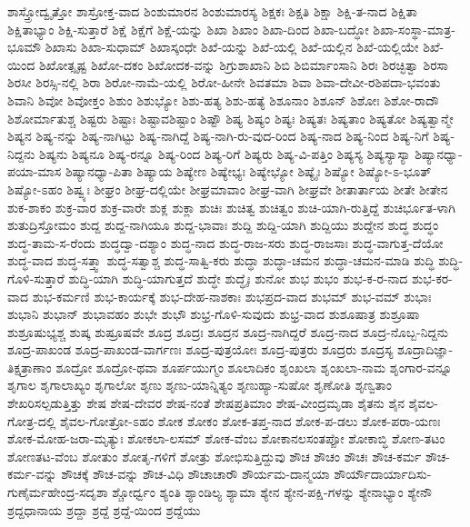 {ಶಾಸ್ತ್ರೋದ್ವೃತ್ತೋ
ಶಾಸ್ರೋಕ್ತ-ವಾದ
ಶಿಂಶುಮಾರನ
ಶಿಂಶುಮಾರಸ್ಯ
ಶಿಕ್ಷಕಃ
ಶಿಕ್ಷತಿ
ಶಿಕ್ಷಾ
ಶಿಕ್ಷಿ-ತ-ನಾದ
ಶಿಕ್ಷಿತಾ
ಶಿಕ್ಷಿತಾಭ್ಯಾಂ
ಶಿಕ್ಷಿ-ಸುತ್ತಾರೆ
ಶಿಕ್ಷೆ
ಶಿಕ್ಷೆಗೆ
ಶಿಕ್ಷೆ-ಯನ್ನು
ಶಿಖಾ
ಶಿಖಾಂ
ಶಿಖಾ-ದಿಂದ
ಶಿಖಾ-ಬದ್ಧೋ
ಶಿಖಾ-ಸಂಸ್ಥಾ-ಮಾತ್ರ-ಭೂಮೌ
ಶಿಖಾಸು
ಶಿಖಾ-ಸುಧಾಮ್
ಶಿಖಾಸ್ಕಂಧೇ
ಶಿಖೆ-ಯನ್ನು
ಶಿಖೆ-ಯಲ್ಲಿ
ಶಿಖೆ-ಯಲ್ಲಿನ
ಶಿಖೆ-ಯಲ್ಲಿಯೇ
ಶಿಖೆ-ಯಿಂದ
ಶಿಖೋತ್ಸೃಷ್ಟ
ಶಿಖೋ-ದಕಂ
ಶಿಖೋದಕ-ವನ್ನು
ಶಿಗ್ರುಶಾಖಾನಿ
ಶಿಬಿ
ಶಿಬಿರ್ಮಾಂಸಾನಿ
ಶಿರಃ
ಶಿರಚ್ಛಿತ್ವಾ
ಶಿರಸಾ
ಶಿರಸೀ
ಶಿರಸ್ಸಿ-ನಲ್ಲಿ
ಶಿರಾ
ಶಿರೋ-ನಾಮೆ-ಯಲ್ಲಿ
ಶಿರೋ-ಹೀನೇ
ಶಿವತಮಾ
ಶಿವಾ
ಶಿವಾ-ದೇವೀ-ರಶಿಪದಾ-ಭವಂತು
ಶಿವಾನಿ
ಶಿವೋ
ಶಿವೋಕ್ತಂ
ಶಿಶುಂ
ಶಿಶುಭ್ಯೋ
ಶಿಶು-ಹತ್ಯ
ಶಿಶು-ಹತ್ಯೆ
ಶಿಶೂನಾಂ
ಶಿಶೂನ್
ಶಿಶೋಃ
ಶಿಶೋ-ರಾದೌ
ಶಿಶೋರ್ಮಾತುಶ್ಚ
ಶಿಷ್ಟರು
ಶಿಷ್ಟಾಃ
ಶಿಷ್ಟಾವಶಿಷ್ಟಾಂ
ಶಿಷ್ಟೌ
ಶಿಷ್ಯ
ಶಿಷ್ಯಂ
ಶಿಷ್ಯಃ
ಶಿಷ್ಯತಃ
ಶಿಷ್ಯತಾಂ
ಶಿಷ್ಯತೋ
ಶಿಷ್ಯತ್ವಾನ್ಮೇ
ಶಿಷ್ಯನ
ಶಿಷ್ಯ-ನನ್ನು
ಶಿಷ್ಯ-ನಾಗಿಟ್ಟು
ಶಿಷ್ಯ-ನಾಗಿದ್ದೆ
ಶಿಷ್ಯ-ನಾಗಿ-ರು-ವುದ-ರಿಂದ
ಶಿಷ್ಯ-ನಾದ
ಶಿಷ್ಯ-ನಿಂದ
ಶಿಷ್ಯ-ನಿಗೆ
ಶಿಷ್ಯ-ನಿದ್ದನು
ಶಿಷ್ಯನು
ಶಿಷ್ಯನೂ
ಶಿಷ್ಯ-ರನ್ನೂ
ಶಿಷ್ಯ-ರಿಂದ
ಶಿಷ್ಯ-ರಿಗೆ
ಶಿಷ್ಯರು
ಶಿಷ್ಯ-ವಿ-ಪತ್ತಿಂ
ಶಿಷ್ಯಸ್ಯ
ಶಿಷ್ಯಸ್ಯಾಸ್ಯಾ
ಶಿಷ್ಯಾನಧ್ಯಾ-ಪಯಾ-ಮಾಸ
ಶಿಷ್ಯಾನಧ್ಯಾ-ಪಿತಾ
ಶಿಷ್ಯಾಯ
ಶಿಷ್ಯೇಣ
ಶಿಷ್ಯೇಭ್ಯಃ
ಶಿಷ್ಯೇಭ್ಯೋ
ಶಿಷ್ಯೈಃ
ಶಿಷ್ಯೋ
ಶಿಷ್ಯೋ-ಽ-ಭೂತ್
ಶಿಷ್ಯೋ-ಽಹಂ
ಶಿಷ್ವ್ಯಃ
ಶೀಘ್ರಂ
ಶೀಘ್ರ-ದಲ್ಲಿಯೇ
ಶೀಘ್ರಮಾವಾಂ
ಶೀಘ್ರ-ವಾಗಿ
ಶೀಘ್ರವೇ
ಶೀತಾರ್ತಾಯ
ಶೀತೇ
ಶೀತೇನ
ಶುಕ-ಶಾಕಂ
ಶುಕ್ರ-ವಾರ
ಶುಕ್ರ-ವಾರೇ
ಶುಕ್ಲ
ಶುಕ್ಲಾ
ಶುಚಿಃ
ಶುಚಿತ್ವ
ಶುಚಿತ್ವಂ
ಶುಚಿ-ಯಾಗಿ-ರುತ್ತಿದ್ದೆ
ಶುಚಿರ್ಭೂತ-ಳಾಗಿ
ಶುತುದ್ರಿಸ್ತೋಮಂ
ಶುದ್ದ
ಶುದ್ದ-ನಾಗಿಯೂ
ಶುದ್ದ-ಭಾವಾಃ
ಶುದ್ದಿ
ಶುದ್ದಿ-ಯಾಗಿ
ಶುದ್ದಿಯು
ಶುದ್ದೇನ
ಶುದ್ಧ
ಶುದ್ಧಂ
ಶುದ್ಧ-ತಾಮ-ಸ-ರೆಂದು
ಶುದ್ಧದ್ವಾ-ದಶ್ಯಾಂ
ಶುದ್ಧ-ನಾದ
ಶುದ್ಧ-ರಾಜ-ಸರು
ಶುದ್ಧ-ರಾಜಸಾಃ
ಶುದ್ಧ-ವಾಗುತ್ತ-ದೆಯೋ
ಶುದ್ಧ-ವಾದ
ಶುದ್ಧ-ಸತ್ತ್ವಾ
ಶುದ್ಧ-ಸತ್ವಾಶ್ಚ
ಶುದ್ಧ-ಸಾತ್ವಿ-ಕರು
ಶುದ್ಧಾ
ಶುದ್ಧಾ-ಚಮನ
ಶುದ್ಧಾ-ಚಮನ-ಮಾಡಿ
ಶುದ್ಧಿ
ಶುದ್ಧಿ-ಗೊಳಿ-ಸುತ್ತಾರೆ
ಶುದ್ಧಿ-ಯಾಗಿ
ಶುದ್ಧಿ-ಯಾಗುತ್ತದೆ
ಶುದ್ಧೇ
ಶುದ್ಧೈಃ
ಶುನೋ
ಶುಭ
ಶುಭಂ
ಶುಭ-ಕ-ರ-ನಾದ
ಶುಭ-ಕರ-ವಾದ
ಶುಭ-ಕರ್ಮಣಿ
ಶುಭ-ಕಾರ್ಯಕ್ಕೆ
ಶುಭ-ದೇಹ-ನಾಶಕಾಃ
ಶುಭಪ್ರದ-ವಾದ
ಶುಭಮ್
ಶುಭ-ವಮ್
ಶುಭಾಃ
ಶುಭಾನಿ
ಶುಭಾನ್
ಶುಭಾವಹಂ
ಶುಭೇ
ಶುಭೌ
ಶುಭ್ರ-ಗೊಳಿ-ಸುವುದು
ಶುಭ್ರ-ವಾದ
ಶುಶೂಷಾತ್ರ
ಶುಶ್ರೂಷಾ
ಶುಶ್ರೂಷುಭ್ಯಶ್ಚ
ಶುಷ್ಕ
ಶುಷ್ರೂಷವೇ
ಶೂದ್ರ
ಶೂದ್ರಃ
ಶೂದ್ರನ
ಶೂದ್ರ-ನಾಗಿದ್ದರೆ
ಶೂದ್ರ-ನಾದ
ಶೂದ್ರ-ನೊಬ್ಬ-ನಿದ್ದನು
ಶೂದ್ರ-ಪಾಖಂಡ
ಶೂದ್ರ-ಪಾಖಂಡ-ವಾರ್ಗಣಃ
ಶೂದ್ರ-ಪುತ್ರಯೋಃ
ಶೂದ್ರ-ಪುತ್ರರು
ಶೂದ್ರರು
ಶೂದ್ರಸ್ಯ
ಶೂದ್ರಾದಿಜ್ಞಾ-ತಿಕ್ಷತ್ರಾಣಾಂ
ಶೂದ್ರೋ
ಶೂದ್ರೋ-ಥವಾ
ಶೂರ್ಪಯುಗ್ಮಂ
ಶೂಲಾದಿಕಂ
ಶೃಂಖಲಾ
ಶೃಂಖಲಾ-ನಾಮ
ಶೃಂಗಾರ-ವನ್ನೂ
ಶೃಗಾಲ
ಶೃಗಾಲಾಖ್ಯಂ
ಶೃಗಾಲೋ
ಶೃಣು
ಶೃಣು-ಯಾನ್ನಿತ್ಯಂ
ಶೃಣುಹ್ಯಾ-ಸುಷೋ
ಶೃಣೋತಿ
ಶೃಣ್ವತಾಂ
ಶೇಖರಿಸಲ್ಪಡುತ್ತಿತ್ತು
ಶೇಷ
ಶೇಷ-ದೇವರ
ಶೇಷ-ನಂತೆ
ಶೇಷಪ್ರತಿಮಾಂ
ಶೇಷ-ವೀಂದ್ರಮೃಡಾ
ಶೈತನು
ಶೈನ
ಶೈವಲ-ಗೋತ್ರ-ದಲ್ಲಿ
ಶೈವಲ-ಗೋತ್ರೋ-ಽಹಂ
ಶೋಕ
ಶೋಕಂ
ಶೋಕ-ತಪ್ತ-ನಾದ
ಶೋಕ-ಪ-ಡಲು
ಶೋಕ-ಪರಾ-ಯಣಃ
ಶೋಕ-ಮೋಹ-ಜರಾ-ಮೃತ್ಯುಃ
ಶೋಕಲಾ-ಲಸಮ್
ಶೋಕ-ವೆಂಬ
ಶೋಕಾನಲಸಂತಪ್ಪೋ
ಶೋಕಾಬ್ಧಿ
ಶೋಣ-ತಟಂ
ಶೋಣತಟ-ವೆಂಬ
ಶೋತುಂ
ಶೋತೃ-ಗಳಿಗೆ
ಶೋತ್ರು
ಶೋಭಿಸುತ್ತಿದ್ದುವು
ಶೌಚ
ಶೌಚಂ
ಶೌಚಃ
ಶೌಚ-ಕರ್ಮ
ಶೌಚ-ಕರ್ಮ-ವನ್ನು
ಶೌಚಕ್ಕೆ
ಶೌಚ-ವನ್ನು
ಶೌಚ-ವಿಧಿ
ಶೌಚಾಚಾರೌ
ಶೌರ್ಯಮ-ದಾನ್ಮಯಾ
ಶೌರ್ಯೌದಾರ್ಯಾದಿಸು-ಗುಣೈರ್ಮಹೇಂದ್ರ-ಸದೃಶಾ
ಶ್ಚೋರ್ಧ್ವಂ
ಶ್ಯಂತಿ
ಶ್ಯಾಂಡಿಲ್ಯ
ಶ್ಯಾಮಾ
ಶ್ಯೇನ
ಶ್ಯೇನ-ಪಕ್ಷಿ-ಗಳನ್ನು
ಶ್ಯೇನಾಭ್ಯಾಂ
ಶ್ಯೇನೌ
ಶ್ರದ್ದಧಾನಾಯ
ಶ್ರದ್ದಾ
ಶ್ರದ್ದೆ
ಶ್ರದ್ದೆ-ಯಿಂದ
ಶ್ರದ್ದೆಯು
}
